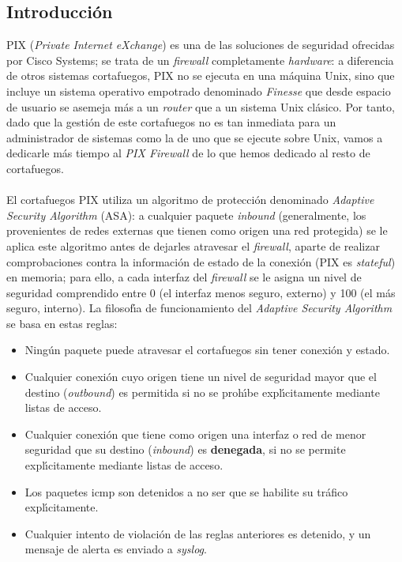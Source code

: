\subsection{Introducci\'on}
PIX ({\it Private Internet eXchange}) es una de las soluciones de seguridad
ofrecidas por Cisco Systems; se trata de un {\it firewall} completamente {\it
hardware}: a diferencia de otros sistemas cortafuegos, PIX no se ejecuta en una
m\'aquina Unix, sino que incluye un sistema operativo empotrado denominado {\it
Finesse} que desde espacio de usuario se asemeja m\'as a un {\it router}
que a un sistema Unix cl\'asico. Por tanto, dado que la gesti\'on de este 
cortafuegos no es tan inmediata para un administrador de sistemas como la de 
uno que se ejecute sobre Unix, vamos a dedicarle m\'as tiempo al {\it PIX 
Firewall} de lo que hemos dedicado al resto de cortafuegos.\\
\\El cortafuegos PIX utiliza un algoritmo de protecci\'on denominado {\it 
Adaptive Security Algorithm} (ASA): a cualquier paquete {\it inbound} 
(generalmente, los provenientes de redes externas que tienen como origen una 
red protegida) se le aplica este algoritmo antes de dejarles atravesar el {\it 
firewall}, aparte de realizar comprobaciones contra la informaci\'on de estado 
de la conexi\'on (PIX es {\it stateful}) en memoria; para ello, a cada interfaz 
del {\it firewall} se le asigna un nivel de seguridad comprendido entre 0 (el 
interfaz menos seguro, externo) y 100 (el m\'as seguro, interno). La 
filosof\'{\i}a de funcionamiento del {\it Adaptive Security Algorithm} se basa 
en estas reglas:
\begin{itemize}
\item Ning\'un paquete puede atravesar el cortafuegos sin tener conexi\'on y 
estado.
\item Cualquier conexi\'on cuyo origen tiene un nivel de seguridad mayor que el 
destino ({\it outbound}) es permitida si no se proh\'{\i}be expl\'{\i}citamente 
mediante listas de acceso.
\item Cualquier conexi\'on que tiene como origen una interfaz o red de menor 
seguridad que su destino ({\it inbound}) es {\bf denegada}, si no se 
permite expl\'{\i}citamente mediante listas de acceso.
\item Los paquetes {\sc icmp} son detenidos a no ser que se habilite su 
tr\'afico expl\'{\i}citamente.
\item Cualquier intento de violaci\'on de las reglas anteriores es detenido, y 
un mensaje de alerta es enviado a {\it syslog}. 
\end{itemize}
